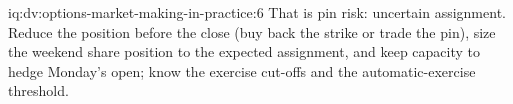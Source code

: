 \begin{solution}{iq:dv:options-market-making-in-practice:6}
That is pin risk: uncertain assignment. Reduce the position before the close (buy back the strike or trade the pin), size the weekend share position to the expected
assignment, and keep capacity to hedge Monday's open; know the exercise cut-offs and the automatic-exercise threshold.
\end{solution}
